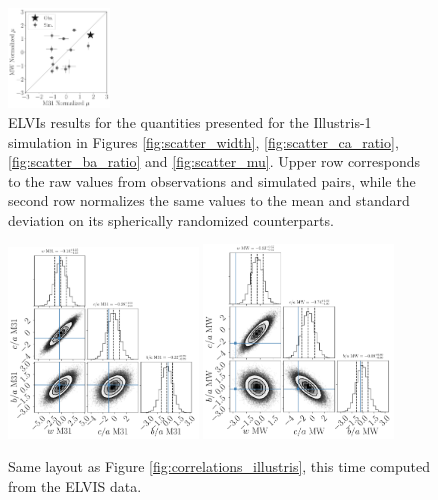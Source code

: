 \documentclass[a4paper,fleqn,usenatbib]{mnras}
\begin{document}
\begin{figure}
\includegraphics[width=0.24\textwidth]{scatter_norm_ranked_elvis_mu.pdf}
\caption{ELVIs results for the quantities presented for the Illustris-1
  simulation in Figures  \ref{fig:scatter_width},
  \ref{fig:scatter_ca_ratio}, \ref{fig:scatter_ba_ratio} and
  \ref{fig:scatter_mu}.
Upper row corresponds to the raw values from observations and
simulated pairs, while the second row normalizes the same values to
the mean and standard deviation on its spherically randomized
counterparts. 
\label{fig:scatter_elvis}}
\end{figure}

\begin{figure}
\centering
\includegraphics[width=0.45\textwidth]{gaussian_model_elvis_M31.pdf}
\includegraphics[width=0.45\textwidth]{gaussian_model_elvis_MW.pdf}
\caption{
Same layout as Figure \ref{fig:correlations_illustris}, this time
computed from the ELVIS data.
\label{fig:correlations_elvis}}
\end{figure}
\end{document}
